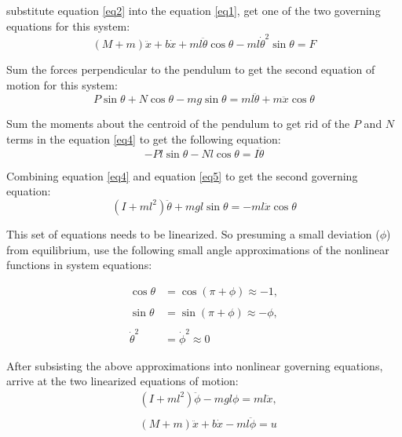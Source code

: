 \documentclass[journal,twoside,web]{ieeecolor}
\begin{document}
substitute equation \eqref{eq2} into the equation \eqref{eq1}, get one of the two governing equations for this system:
\begin{equation}(M+m)\ddot{x}+b\dot{x}+ml\ddot{\theta}\cos\theta-ml\dot{\theta}^2\sin\theta=F\label{eq3}\end{equation}

Sum the forces perpendicular to the pendulum to get the second equation of motion for this system:
\begin{equation}P\sin\theta+N\cos\theta-mg\sin\theta=ml\ddot{\theta}+m\ddot{x}\cos\theta \label{eq4}\end{equation}

Sum the moments about the centroid of the pendulum to get rid of the $P$ and $N$ terms in the equation \eqref{eq4} to get the following equation:
\begin{equation}-Pl\sin\theta-Nl\cos\theta=I\ddot{\theta}\label{eq5}\end{equation}

Combining equation \eqref{eq4} and equation \eqref{eq5} to get the second governing equation:
\begin{equation}(I+ml^2)\ddot{\theta}+mgl\sin\theta=-ml\ddot{x}\cos\theta \label{eq6}\end{equation}

This set of equations needs to be linearized. So presuming a small deviation ($\phi$) from equilibrium, use the following small angle approximations of the nonlinear functions in  system equations:

\begin{equation}\label{eq7}\begin{aligned}\cos\theta&=\cos(\pi+\phi)\approx-1 ,\\\\\sin\theta&=\sin(\pi+\phi)\approx-\phi,\\\\\dot\theta^2&=\dot\phi^2\approx0\end{aligned}\end{equation}

After subsisting the above approximations into nonlinear governing equations, arrive at the two linearized equations of motion:
\begin{equation}\label{eq8}\begin{aligned}&(I+ml^2)\ddot{\phi}-mgl\phi=ml\ddot{x},\\\\&(M+m)\ddot{x}+b\dot{x}-ml\ddot{\phi}=u\end{aligned}\end{equation}
\end{document}
